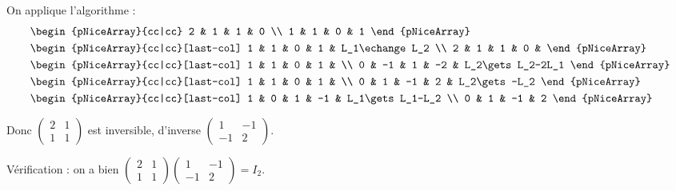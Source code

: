 \begin{corr}
On applique l'algorithme : \[\begin{aligned}
&\begin{pNiceArray}{cc|cc}
2 & 1 & 1 & 0 \\
1 & 1 & 0 & 1
\end{pNiceArray} \\
&\begin{pNiceArray}{cc|cc}[last-col]
1 & 1 & 0 & 1 & L_1\echange L_2 \\
2 & 1 & 1 & 0 &
\end{pNiceArray} \\
&\begin{pNiceArray}{cc|cc}[last-col]
1 & 1 & 0 & 1 & \\
0 & -1 & 1 & -2 & L_2\gets L_2-2L_1
\end{pNiceArray} \\
&\begin{pNiceArray}{cc|cc}[last-col]
1 & 1 & 0 & 1 & \\
0 & 1 & -1 & 2 & L_2\gets-L_2
\end{pNiceArray} \\
&\begin{pNiceArray}{cc|cc}[last-col]
1 & 0 & 1 & -1 & L_1\gets L_1-L_2 \\
0 & 1 & -1 & 2
\end{pNiceArray}
\end{aligned}\]

Donc \(\begin{pmatrix}
2 & 1 \\
1 & 1
\end{pmatrix}\) est inversible, d'inverse \(\begin{pmatrix}
1 & -1 \\
-1 & 2
\end{pmatrix}\).

Vérification : on a bien \(\begin{pmatrix}
2 & 1 \\
1 & 1
\end{pmatrix}\begin{pmatrix}
1 & -1 \\
-1 & 2
\end{pmatrix}=I_2\).
\end{corr}